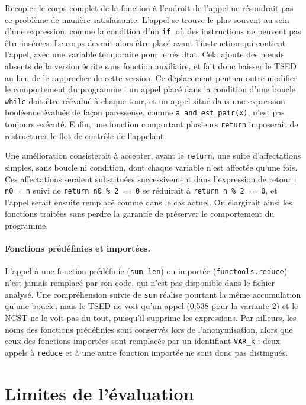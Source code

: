 \documentclass[12pt,a4paper,oneside]{report}
\begin{document}
Recopier le corps complet de la fonction à l'endroit de l'appel ne
résoudrait pas ce problème de manière satisfaisante. L'appel se trouve le
plus souvent au sein d'une expression, comme la condition d'un \texttt{if},
où des instructions ne peuvent pas être insérées. Le corps devrait alors
être placé avant l'instruction qui contient l'appel, avec une variable
temporaire pour le résultat. Cela ajoute des nœuds absents de la version
écrite sans fonction auxiliaire, et fait donc baisser le TSED au lieu de le
rapprocher de cette version. Ce déplacement peut en outre modifier le
comportement du programme : un appel placé dans la condition d'une boucle
\texttt{while} doit être réévalué à chaque tour, et un appel situé dans une
expression booléenne évaluée de façon paresseuse, comme
\texttt{a and est\_pair(x)}, n'est pas toujours exécuté. Enfin, une
fonction comportant plusieurs \texttt{return} imposerait de restructurer le
flot de contrôle de l'appelant.

Une amélioration consisterait à accepter, avant le \texttt{return}, une
suite d'affectations simples, sans boucle ni condition, dont chaque
variable n'est affectée qu'une fois. Ces affectations seraient substituées
successivement dans l'expression de retour : \texttt{n0 = n} suivi de
\texttt{return n0 \% 2 == 0} se réduirait à \texttt{return n \% 2 == 0}, et
l'appel serait ensuite remplacé comme dans le cas actuel. On élargirait
ainsi les fonctions traitées sans perdre la garantie de préserver le
comportement du programme.

\paragraph{Fonctions prédéfinies et importées.}
L'appel à une fonction prédéfinie (\texttt{sum}, \texttt{len}) ou importée
(\texttt{functools.reduce}) n'est jamais remplacé par son code, qui n'est pas
disponible dans le fichier analysé. Une compréhension suivie de
\texttt{sum} réalise pourtant la même accumulation qu'une boucle, mais le
TSED ne voit qu'un appel (0,538 pour la variante 2) et le NCST ne le voit pas
du tout, puisqu'il supprime les expressions. Par ailleurs, les noms des
fonctions prédéfinies sont conservés lors de l'anonymisation, alors que ceux
des fonctions importées sont remplacés par un identifiant \texttt{VAR\_k} :
deux appels à \texttt{reduce} et à une autre fonction importée ne sont donc
pas distingués.
\section{Limites de l'évaluation}
\end{document}
